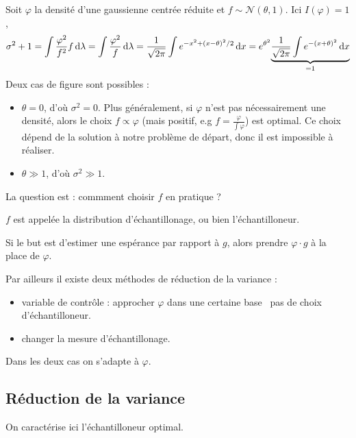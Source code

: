 	\begin{ex}
		Soit $\varphi$ la densité d'une gaussienne centrée réduite et $f \sim \mathcal{N}(\theta,1)$.
		Ici $I(\varphi) = 1$,
		$$\sigma^2 + 1
		= \int \frac{\varphi^2}{f^2} f \mathop{}\mathopen{}\mathrm{d} \lambda
		= \int \frac{\varphi^2}{f} \mathop{}\mathopen{}\mathrm{d} \lambda
		= \frac{1}{\sqrt{2\pi}} \int e^{-x^2 + (x - \theta)^2/2} \mathop{}\mathopen{}\mathrm{d} x
		= e^{\theta^2} \underset{= 1}{\underbrace{ \frac{1}{\sqrt{2\pi}} \int e^{-(x + \theta)^2} \mathop{}\mathopen{}\mathrm{d} x }}$$
		Deux cas de figure sont possibles :
		\begin{itemize}
			\item[\textbullet] $\theta = 0$, d'où $\sigma^2 = 0$.
				Plus généralement, si $\varphi$ n'est pas nécessairement une densité, alors le choix $f \propto \varphi$ (mais positif, e.g $f = \frac{\varphi}{\int \varphi}$) est optimal.
				Ce choix dépend de la solution à notre problème de départ, donc il est impossible à réaliser.
			\item[\textbullet] $\theta \gg 1$, d'où $\sigma^2 \gg 1$.
		\end{itemize}
	\end{ex}
	
	La question est : commment choisir $f$ en pratique ?
	
	\begin{rem}
		$f$ est appelée la distribution d'échantillonage, ou bien l'échantilloneur.
	\end{rem}
	
	\begin{rem}
		Si le but est d'estimer une espérance par rapport à $g$, alors prendre $\varphi \cdot g$ à la place de $\varphi$.
	\end{rem}
	
	Par ailleurs il existe deux méthodes de réduction de la variance :
	\begin{itemize}
		\item[\textbullet] variable de contrôle : approcher $\varphi$ dans une certaine base \textrightarrow\ pas de choix d'échantilloneur.
		\item[\textbullet] changer la mesure d'échantillonage.
	\end{itemize}
	Dans les deux cas on s'adapte à $\varphi$.


\subsection{Réduction de la variance}

	On caractérise ici l'échantilloneur optimal.
	
